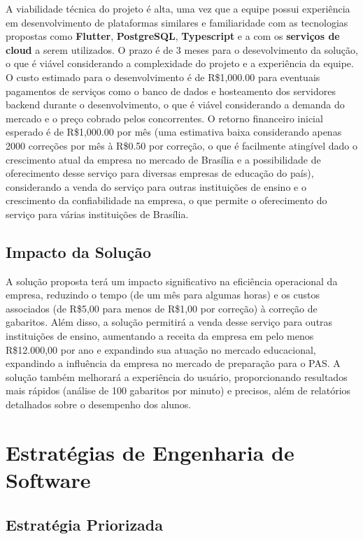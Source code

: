 \documentclass[12pt]{article}
\begin{document}
A viabilidade técnica do projeto é alta, uma vez que a equipe possui experiência em desenvolvimento de plataformas similares e familiaridade com as tecnologias propostas como \textbf{Flutter}, \textbf{PostgreSQL}, \textbf{Typescript} e a com os \textbf{serviços de cloud} a serem utilizados. O prazo é de 3 meses para o desevolvimento da solução, o que é viável considerando a complexidade do projeto e a experiência da equipe. O custo estimado para o desenvolvimento é de R\$1,000.00 para eventuais pagamentos de serviços como o banco de dados e hosteamento dos servidores backend durante o desenvolvimento, o que é viável considerando a demanda do mercado e o preço cobrado pelos concorrentes. O retorno financeiro inicial esperado é de R\$1,000.00 por mês (uma estimativa baixa considerando apenas 2000 correções por mês à R\$0.50 por correção, o que é facilmente atingível dado o crescimento atual da empresa no mercado de Brasília e a possibilidade de oferecimento desse serviço para diversas empresas de educação do país), considerando a venda do serviço para outras instituições de ensino e o crescimento da confiabilidade na empresa, o que permite o oferecimento do serviço para várias instituições de Brasília.

\subsection{Impacto da Solução}

A solução proposta terá um impacto significativo na eficiência operacional da empresa, reduzindo o tempo (de um mês para algumas horas) e os custos associados (de R\$5,00 para menos de R\$1,00 por correção) à correção de gabaritos. Além disso, a solução permitirá a venda desse serviço para outras instituições de ensino, aumentando a receita da empresa em pelo menos R\$12.000,00 por ano e expandindo sua atuação no mercado educacional, expandindo a influência da empresa no mercado de preparação para o PAS. A solução também melhorará a experiência do usuário, proporcionando resultados mais rápidos (análise de 100 gabaritos por minuto) e precisos, além de relatórios detalhados sobre o desempenho dos alunos. 

\section{Estratégias de Engenharia de Software}

\subsection{Estratégia Priorizada}
\end{document}
